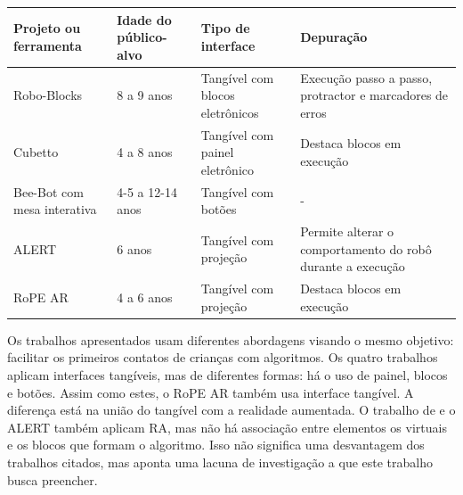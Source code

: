 {{\renewcommand{\arraystretch}{1.5}
    \begin{quadro}[!h]
        \begin{tabularx}{\textwidth}{ @{} | p{.2\linewidth} | p{.1\linewidth} | X | X | @{} }
        \hline
        \textbf{Projeto ou ferramenta}  & \textbf{Idade do público-alvo}  & \textbf{Tipo de interface}       &\textbf{Depuração}                                          \\ \hline
        
        Robo-Blocks                     & 8 a 9 anos                      & Tangível com blocos eletrônicos  & Execução passo a passo, protractor e marcadores de erros   \\ \hline
        Cubetto                         & 4 a 8 anos                      & Tangível com painel eletrônico   & Destaca blocos em execução                                 \\ \hline
        Bee-Bot com mesa interativa     & 4-5 a 12-14 anos                & Tangível com botões              & -                                  \\ \hline
        ALERT                           & 6 anos                          & Tangível com projeção            & Permite alterar o comportamento do robô durante a execução \\ \hline
        RoPE AR                   & 4 a 6 anos                      & Tangível com projeção            & Destaca blocos em execução                                 \\ \hline
        \end{tabularx}
        \vspace{-10pt}
        \sourceauthor
        \label{quadro:comparision}
    \end{quadro}
}

Os trabalhos apresentados usam diferentes abordagens visando o mesmo objetivo: facilitar os primeiros contatos de crianças com algoritmos. Os quatro trabalhos aplicam interfaces tangíveis, mas de diferentes formas: há o uso de painel, blocos e botões. Assim como estes, o RoPE AR também usa interface tangível. A diferença está na união do tangível com a realidade aumentada. O trabalho de  e o ALERT também aplicam RA, mas não há associação entre elementos os virtuais e os blocos que formam o algoritmo. Isso não significa uma desvantagem dos trabalhos citados, mas aponta uma lacuna de investigação a que este trabalho busca preencher.

}
